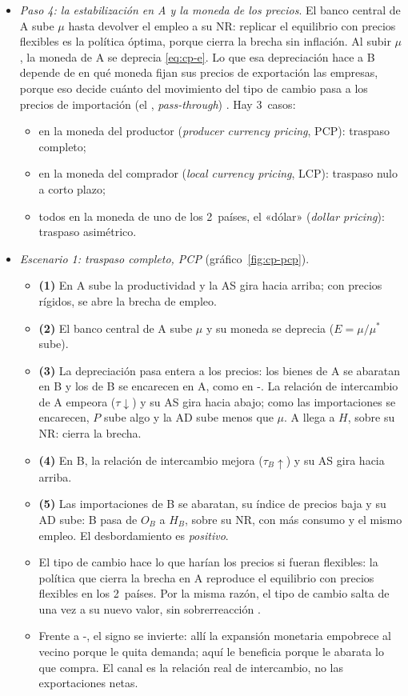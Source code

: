 \documentclass[11pt]{article}
\begin{document}
\begin{itemize}
\item \emph{Paso 4: la estabilización en A y la moneda de los precios}. El banco central de A sube $\mu$ hasta devolver el empleo a su NR: replicar el equilibrio con precios flexibles es la política óptima, porque cierra la brecha sin inflación. Al subir $\mu$, la moneda de A se deprecia \eqref{eq:cp-e}. Lo que esa depreciación hace a B depende de en qué moneda fijan sus precios de exportación las empresas, porque eso decide cuánto del movimiento del tipo de cambio pasa a los precios de importación (el , \emph{pass-through}) . Hay 3~casos:
  \begin{itemize}
  \item en la moneda del productor (\emph{producer currency pricing}, PCP): traspaso completo;
  \item en la moneda del comprador (\emph{local currency pricing}, LCP): traspaso nulo a corto plazo;
  \item todos en la moneda de uno de los 2~países, el «dólar» (\emph{dollar pricing}): traspaso asimétrico.
  \end{itemize}
\item \emph{Escenario 1: traspaso completo, PCP} (gráfico~\ref{fig:cp-pcp}).
  \begin{itemize}
  \item \textbf{(1)} En A sube la productividad y la AS gira hacia arriba; con precios rígidos, se abre la brecha de empleo.
  \item \textbf{(2)} El banco central de A sube $\mu$ y su moneda se deprecia ($E=\mu/\mu^*$ sube).
  \item \textbf{(3)} La depreciación pasa entera a los precios: los bienes de A se abaratan en B y los de B se encarecen en A, como en -. La relación de intercambio de A empeora ($\tau\downarrow$) y su AS gira hacia abajo; como las importaciones se encarecen, $P$ sube algo y la AD sube menos que $\mu$. A llega a $H$, sobre su NR: cierra la brecha.
  \item \textbf{(4)} En B, la relación de intercambio mejora ($\tau_B\uparrow$) y su AS gira hacia arriba.
  \item \textbf{(5)} Las importaciones de B se abaratan, su índice de precios baja y su AD sube: B pasa de $O_B$ a $H_B$, sobre su NR, con más consumo y el mismo empleo. El desbordamiento es \emph{positivo}.
  \item El tipo de cambio hace lo que harían los precios si fueran flexibles: la política que cierra la brecha en A reproduce el equilibrio con precios flexibles en los 2~países. Por la misma razón, el tipo de cambio salta de una vez a su nuevo valor, sin sobrerreacción .
  \item Frente a -, el signo se invierte: allí la expansión monetaria empobrece al vecino porque le quita demanda; aquí le beneficia porque le abarata lo que compra. El canal es la relación real de intercambio, no las exportaciones netas.
  \end{itemize}
\end{itemize}
\end{document}
